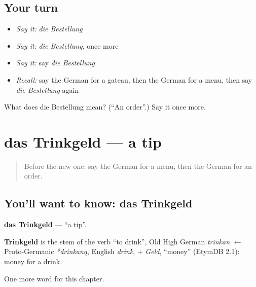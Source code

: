 \subsection*{Your turn}
\begin{itemize}
\raggedright
  \item \emph{Say it:} \emph{die Bestellung}
  \item \emph{Say it:} \emph{die Bestellung}, once more
  \item \emph{Say it:} say \emph{die Bestellung}
  \item \emph{Recall:} say the German for a gateau, then the German for a menu, then say \emph{die Bestellung} again
\end{itemize}

\begin{tcolorbox}[breakable,colback=teal!4,colframe=teal!35!black,title={Before you move on}]
What does die Bestellung mean? (\textquotedblleft{}An order\textquotedblright{}.) Say it once more.
\end{tcolorbox}
\section[das Trinkgeld]{das Trinkgeld — a tip}

\label{lesson:GE-C200-trinkgeld}



\begin{quote}
Before the new one: say the German for a menu, then the German for an order.
\end{quote}

\subsection*{You'll want to know: das Trinkgeld}
\textbf{das Trinkgeld} — \textquotedblleft{}a tip\textquotedblright{}.

\begin{cousinweb}
\textbf{Trinkgeld} is the stem of the verb \textquotedblleft{}to drink\textquotedblright{}, Old High German \emph{trinkan} $\leftarrow$ Proto-Germanic \emph{*drinkaną}, English \emph{drink}, + \emph{Geld}, \textquotedblleft{}money\textquotedblright{} (EtymDB 2.1): money for a drink.
\end{cousinweb}

\begin{grammarlens}[title={What you've built}]
One more word for this chapter.
\end{grammarlens}

